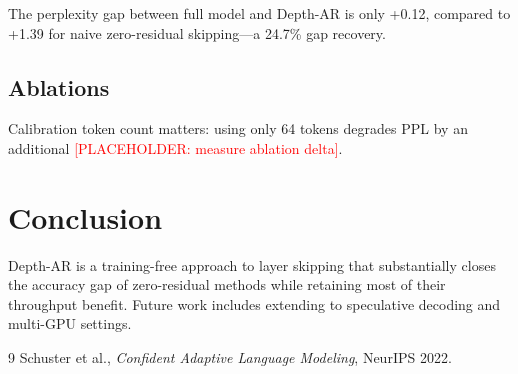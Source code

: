 \documentclass{article}
\newcommand{\ph}[1]{\textcolor{red}{[PLACEHOLDER: #1]}}
\newcommand{\phm}[2]{#2}
\newcommand{\mname}{Depth-AR}
\begin{document}
The perplexity gap between full model and \mname{} is only
\phm{ppl_delta}{+0.12}, compared to \phm{zero_ppl_delta}{+1.39}
for naive zero-residual skipping—a \phm{recovery_pct}{24.7}\%
gap recovery.

\subsection{Ablations}
Calibration token count matters: using only \phm{small_calib}{64}
tokens degrades PPL by an additional \ph{measure ablation delta}.

\section{Conclusion}

\mname{} is a training-free approach to layer skipping that
substantially closes the accuracy gap of zero-residual methods
while retaining most of their throughput benefit. Future work
includes extending to speculative decoding and multi-GPU settings.


\begin{thebibliography}{9}
  Schuster et al.,
  \emph{Confident Adaptive Language Modeling},
  NeurIPS 2022.
\end{thebibliography}
\end{document}

